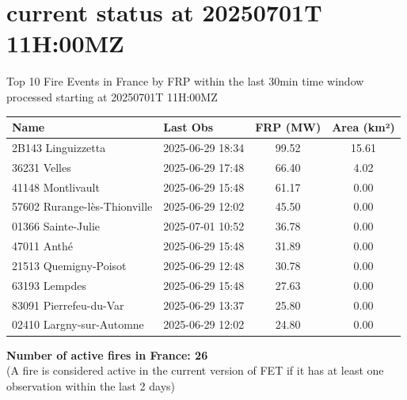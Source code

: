 \documentclass{article}
\begin{document}
\vspace*{-1.5cm} %
\noindent
{}

\vspace{1cm} %

\section{current status at 20250701T 11H:00MZ}
Top 10 Fire Events in France by FRP within the last 30min time window processed starting at 20250701T 11H:00MZ
\begin{table}[H]
\centering
\begin{tabular}{llcc}
\toprule
\textbf{Name} & \textbf{Last Obs} & \textbf{FRP (MW)} & \textbf{Area (km²)} \\
\midrule
2B143 Linguizzetta&2025-06-29 18:34&99.52&15.61\\
36231 Velles&2025-06-29 17:48&66.40&4.02\\
41148 Montlivault&2025-06-29 15:48&61.17&0.00\\
57602 Rurange-lès-Thionville&2025-06-29 12:02&45.50&0.00\\
01366 Sainte-Julie&2025-07-01 10:52&36.78&0.00\\
47011 Anthé&2025-06-29 15:48&31.89&0.00\\
21513 Quemigny-Poisot&2025-06-29 12:48&30.78&0.00\\
63193 Lempdes&2025-06-29 15:48&27.63&0.00\\
83091 Pierrefeu-du-Var&2025-06-29 13:37&25.80&0.00\\
02410 Largny-sur-Automne&2025-06-29 12:02&24.80&0.00\\

\bottomrule
\end{tabular}
\end{table}
\textbf{Number of active fires in France: 26 } \\
(A fire is considered active in the current version of FET if it has at least one observation within the last 2 days)
\end{document}
